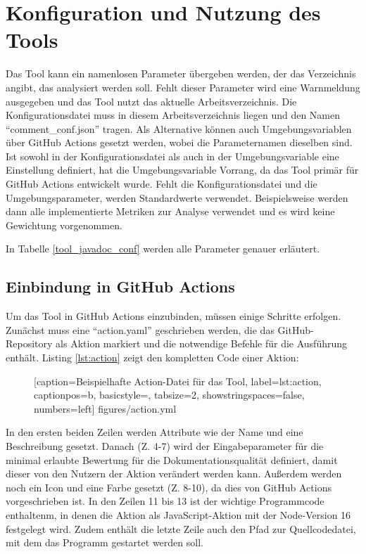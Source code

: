 \section{Konfiguration und Nutzung des Tools}
Das Tool kann ein namenlosen Parameter übergeben werden, der das Verzeichnis angibt, das analysiert werden soll. Fehlt dieser Parameter wird eine Warnmeldung ausgegeben und das Tool nutzt das aktuelle Arbeitsverzeichnis. Die Konfigurationsdatei muss in diesem Arbeitsverzeichnis liegen und den Namen \enquote{comment\_conf.json} tragen. Als Alternative können auch Umgebungsvariablen über GitHub Actions gesetzt werden, wobei die Parameternamen dieselben sind. Ist sowohl in der Konfigurationsdatei als auch in der Umgebungsvariable eine Einstellung definiert, hat die Umgebungsvariable Vorrang, da das Tool primär für GitHub Actions entwickelt wurde. Fehlt die Konfigurationsdatei und die Umgebungsparameter, werden Standardwerte verwendet. Beispielsweise werden dann alle implementierte Metriken zur Analyse verwendet und es wird keine Gewichtung vorgenommen.

In Tabelle \ref{tool_javadoc_conf} werden alle Parameter genauer erläutert.


\subsection{Einbindung in GitHub Actions}\label{chapter:github_actions_impl}
Um das Tool in GitHub Actions einzubinden, müssen einige Schritte erfolgen. Zunächst muss eine \enquote{action.yaml} geschrieben werden, die das GitHub-Repository als Aktion markiert und die notwendige Befehle für die Ausführung enthält. Listing  \ref{lst:action} zeigt den kompletten Code einer Aktion:
\begin{figure} [htbp]

[caption={Beispielhafte Action-Datei für das Tool},
label={lst:action},
captionpos=b, basicstyle=\footnotesize, tabsize=2, showstringspaces=false,  numbers=left]
{figures/action.yml}
\end{figure}

In den ersten beiden Zeilen werden Attribute wie der Name und eine Beschreibung gesetzt. Danach (Z. 4-7) wird der Eingabeparameter für die minimal erlaubte Bewertung für die Dokumentationsqualität definiert, damit dieser von den Nutzern der Aktion verändert werden kann.  Außerdem werden noch ein Icon und eine Farbe gesetzt (Z. 8-10), da dies von GitHub Actions vorgeschrieben ist. In den Zeilen 11 bis 13 ist der wichtige Programmcode enthaltenm, in denen die Aktion als JavaScript-Aktion mit der Node-Version 16 festgelegt wird. Zudem enthält die letzte Zeile auch den Pfad zur Quellcodedatei, mit dem das Programm gestartet werden soll. 

